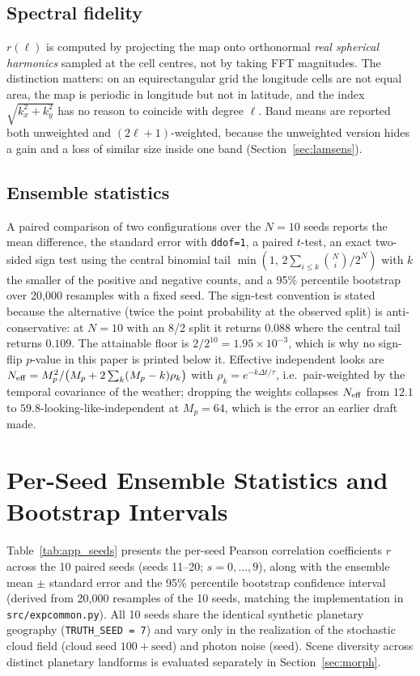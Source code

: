 \documentclass[twocolumn,10pt]{article}
\begin{document}
\subsection{Spectral fidelity}
$r(\ell)$ is computed by projecting the map onto orthonormal \emph{real
spherical harmonics} sampled at the cell centres, not by taking FFT magnitudes.
The distinction matters: on an equirectangular grid the longitude cells are not
equal area, the map is periodic in longitude but not in latitude, and the index
$\sqrt{k_x^2+k_y^2}$ has no reason to coincide with degree $\ell$. Band means are
reported both unweighted and $(2\ell+1)$-weighted, because the unweighted
version hides a gain and a loss of similar size inside one band
(Section~\ref{sec:lamsens}).

\subsection{Ensemble statistics}
A paired comparison of two configurations over the $N=10$ seeds reports the mean
difference, the standard error with \texttt{ddof=1}, a paired $t$-test, an exact
two-sided sign test using the central binomial tail
$\min(1,\,2\sum_{i\le k}\binom{N}{i}/2^N)$ with $k$ the smaller of the positive
and negative counts, and a 95\% percentile bootstrap over 20{,}000 resamples
with a fixed seed. The sign-test convention is stated because the alternative
(twice the point probability at the observed split) is anti-conservative: at
$N=10$ with an 8/2 split it returns $0.088$ where the central tail returns
$0.109$. The attainable floor is $2/2^{10}=1.95\times10^{-3}$, which is why no
sign-flip $p$-value in this paper is printed below it. Effective independent
looks are $N_{\rm eff}=M_p^2/\big(M_p+2\sum_{k}(M_p-k)\rho_k\big)$ with
$\rho_k=e^{-k\Delta t/\tau}$, i.e.\ pair-weighted by the temporal covariance of
the weather; dropping the weights collapses $N_{\rm eff}$ from $12.1$ to
$59.8$-looking-like-independent at $M_p=64$, which is the error an earlier draft
made.

\section{Per-Seed Ensemble Statistics and Bootstrap Intervals}
\label{app:seeds}
\label{sec:appendix_stats}
Table~\ref{tab:app_seeds} presents the per-seed Pearson correlation coefficients $r$ across the 10 paired seeds (seeds 11--20; $s=0,\dots,9$), along with the ensemble mean $\pm$ standard error and the 95\% percentile bootstrap confidence interval (derived from 20{,}000 resamples of the 10 seeds, matching the implementation in {\tt src/expcommon.py}). All 10 seeds share the identical synthetic planetary geography ({\tt TRUTH\_SEED = 7}) and vary only in the realization of the stochastic cloud field (cloud seed $100 + \mathrm{seed}$) and photon noise (seed). Scene diversity across distinct planetary landforms is evaluated separately in Section~\ref{sec:morph}.
\end{document}
